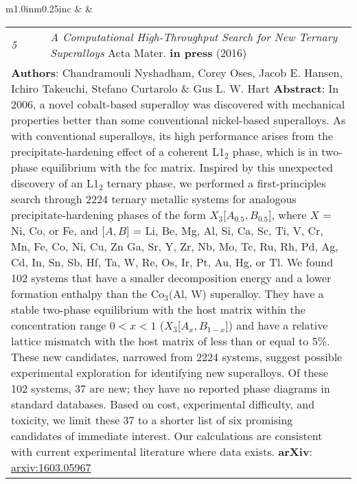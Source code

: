 \documentclass[11pt]{article}
\begin{document}
\begin{tabular}{m{1.0in}m{0.25in}c}
 & & 
\begin{tabular}{m{0.3in}m{0.15in}m{4.3in}}
\textit{\small{5}} & & \textit{A Computational High-Throughput Search for New Ternary Superalloys} \newline Acta Mater. \textbf{in press} (2016)  \\ \multicolumn{3}{p{4.75in}}{\footnotesize{\textbf{Authors}: Chandramouli Nyshadham, \textcolor{NavyBlue}{Corey Oses}, Jacob E. Hansen, Ichiro Takeuchi, Stefano Curtarolo \& Gus L. W. Hart \newline \textbf{Abstract}: In 2006, a novel cobalt-based superalloy was discovered with mechanical properties better than some conventional nickel-based superalloys. As with conventional superalloys, its high performance arises from the precipitate-hardening effect of a coherent L1$_{2}$ phase, which is in two-phase equilibrium with the fcc matrix. Inspired by this unexpected discovery of an L1$_{2}$ ternary phase, we performed a first-principles search through 2224 ternary metallic systems for analogous precipitate-hardening phases of the form $X_{3}$[$A_{0.5}, B_{0.5}$], where $X$ = Ni, Co, or Fe, and [$A,B$] = Li, Be, Mg, Al, Si, Ca, Sc, Ti, V, Cr, Mn, Fe, Co, Ni, Cu, Zn Ga, Sr, Y, Zr, Nb, Mo, Tc, Ru, Rh, Pd, Ag, Cd, In, Sn, Sb, Hf, Ta, W, Re, Os, Ir, Pt, Au, Hg, or Tl. We found 102 systems that have a smaller decomposition energy and a lower formation enthalpy than the Co$_{3}$(Al, W) superalloy. They have a stable two-phase equilibrium with the host matrix within the concentration range $0<x<1$ ($X_{3}$[$A_{x}, B_{1-x}$]) and have a relative lattice mismatch with the host matrix of less than or equal to 5\%. These new candidates, narrowed from 2224 systems, suggest possible experimental exploration for identifying new superalloys. Of these 102 systems, 37 are new; they have no reported phase diagrams in standard databases. Based on cost, experimental difficulty, and toxicity, we limit these 37 to a shorter list of six promising candidates of immediate interest. Our calculations are consistent with current experimental literature where data exists. \newline \textbf{arXiv}: \href{http://arxiv.org/abs/1603.05967}{arxiv:1603.05967}}} 
\end{tabular} \\ 
\end{tabular}

\vspace{0.25cm}
\end{document}

